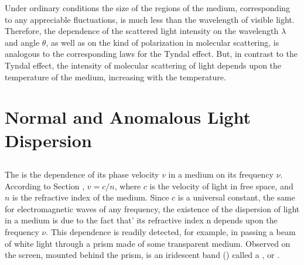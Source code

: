 Under ordinary conditions the size of the regions of the
medium, corresponding to any appreciable fluctuations, is much
less than the wavelength of visible light. Therefore, the dependence of the scattered light intensity on the wavelength $\lambda$ and angle $\theta$, as well as on the kind of polarization in molecular scattering, is analogous to the corresponding laws for the Tyndal effect. But, in contrast to the Tyndal effect, the intensity of molecular scattering of light depends upon the temperature of the medium, increasing with the temperature.

\section{Normal and Anomalous Light Dispersion}
\label{sec-34.4} 



\subsection{}\label{34.4.1} The  is the dependence of its phase velocity $v$ in a medium on its frequency $\nu$. According to Section , $v = c/n$, where $c$ is the velocity of light in free space, and $n$ is the refractive index of the medium. Since $c$ is a universal constant, the same for electromagnetic waves of any frequency, the existence of the dispersion of light in a medium is due to the fact that' its refractive index n depends upon the frequency $\nu$. This dependence is readily detected, for example, in pas­sing a beam of white light through a prism made of some transparent medium. Observed on the screen, mounted behind the prism, is an iridescent band () called a , or .

